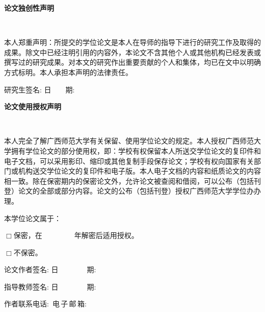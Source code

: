 ﻿\newpage
\thispagestyle{empty}
{\songti
\begin{center}
{\xiaoerhao\textbf{论文独创性声明}}
\end{center}
}
\begin{flushleft}
\setlength{\parindent}{2em}
\ \par
本人郑重声明：所提交的学位论文是本人在导师的指导下进行的研究工作及取得的成果。除文中已经注明引用的内容外，本论文不含其他个人或其他机构已经发表或撰写过的研究成果。对本文的研究作出重要贡献的个人和集体，均已在文中以明确方式标明。本人承担本声明的法律责任。\par
\end{flushleft}
\begin{flushright}
研究生签名: \underline{\hspace{2.5cm}}
日~~~~期: \underline{\hspace{2.5cm}}
\end{flushright}
\vspace{2cm}
{\songti
\begin{center}
{\xiaoerhao\textbf{论文使用授权声明}}
\end{center}
}
\begin{flushleft}
\setlength{\parindent}{2em}
\ \par
本人完全了解广西师范大学有关保留、使用学位论文的规定。本人授权广西师范大学拥有学位论文的部分使用权，即：学校有权保留本人所送交学位论文的复印件和电子文档，可以采用影印、缩印或其他复制手段保存论文；学校有权向国家有关部门或机构送交学位论文的复印件和电子版。本人电子文档的内容和纸质论文的内容相一致。除在保密期内的保密论文外，允许论文被查阅和借阅，可以公布（包括刊登）论文的全部或部分内容。论文的公布（包括刊登）授权广西师范大学学位办办理。\par
本学位论文属于：\par
$\Box$保密，在~~~~~~~~~年解密后适用授权。\par
$\Box$不保密。\par
\end{flushleft}
\begin{flushright}
论文作者签名: \underline{\hspace{2.5cm}}
日~~~~~~~~期: \underline{\hspace{2.5cm}}\par
指导教师签名: \underline{\hspace{2.5cm}}
日~~~~~~~~期: \underline{\hspace{2.5cm}}\par
作者联系电话: \underline{\hspace{2.5cm}}
\,电\,子\,邮\,箱: \underline{\hspace{2.5cm}}\par
\end{flushright}

